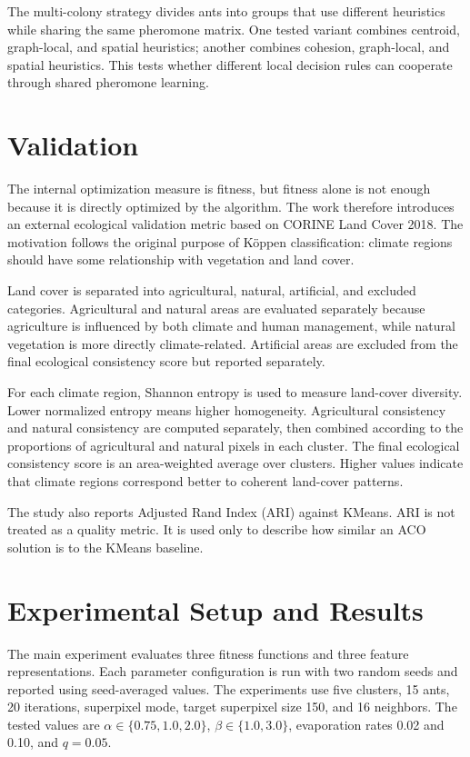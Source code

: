 \documentclass[11pt]{article}
\begin{document}
The multi-colony strategy divides ants into groups that use different heuristics while sharing the same pheromone matrix. One tested variant combines centroid, graph-local, and spatial heuristics; another combines cohesion, graph-local, and spatial heuristics. This tests whether different local decision rules can cooperate through shared pheromone learning.

\section*{Validation}

The internal optimization measure is fitness, but fitness alone is not enough because it is directly optimized by the algorithm. The work therefore introduces an external ecological validation metric based on CORINE Land Cover 2018. The motivation follows the original purpose of Köppen classification: climate regions should have some relationship with vegetation and land cover.

Land cover is separated into agricultural, natural, artificial, and excluded categories. Agricultural and natural areas are evaluated separately because agriculture is influenced by both climate and human management, while natural vegetation is more directly climate-related. Artificial areas are excluded from the final ecological consistency score but reported separately.

For each climate region, Shannon entropy is used to measure land-cover diversity. Lower normalized entropy means higher homogeneity. Agricultural consistency and natural consistency are computed separately, then combined according to the proportions of agricultural and natural pixels in each cluster. The final ecological consistency score is an area-weighted average over clusters. Higher values indicate that climate regions correspond better to coherent land-cover patterns.

The study also reports Adjusted Rand Index (ARI) against KMeans. ARI is not treated as a quality metric. It is used only to describe how similar an ACO solution is to the KMeans baseline.

\section*{Experimental Setup and Results}

The main experiment evaluates three fitness functions and three feature representations. Each parameter configuration is run with two random seeds and reported using seed-averaged values. The experiments use five clusters, 15 ants, 20 iterations, superpixel mode, target superpixel size 150, and 16 neighbors. The tested values are $\alpha \in \{0.75, 1.0, 2.0\}$, $\beta \in \{1.0, 3.0\}$, evaporation rates 0.02 and 0.10, and $q=0.05$.
\end{document}
